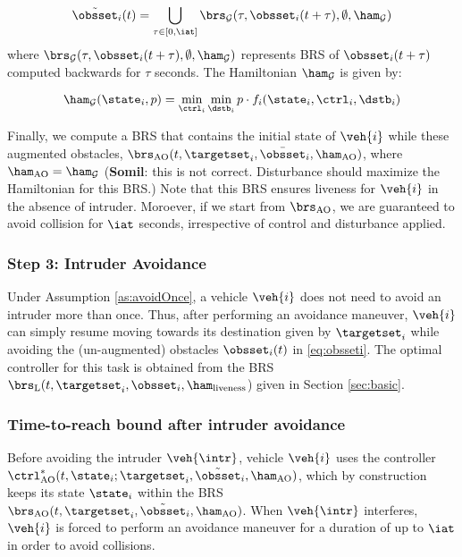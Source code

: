 \begin{equation} \label{eqn:inducedobs}
\tilde\obsset_i(t) = \bigcup_{\tau \in [0, \iat]} \brs_{\mathcal{G}}(\tau, \obsset_i(t+\tau), \emptyset, \ham_{\mathcal{G}})
\end{equation}
where $\brs_{\mathcal{G}}(\tau, \obsset_i(t+\tau), \emptyset, \ham_{\mathcal{G}})$ represents BRS of $\obsset_i(t+\tau)$ computed backwards for $\tau$ seconds. The Hamiltonian 
$\ham_{\mathcal{G}}$ is given by:

\begin{equation} \label{eqn:BRSham}
\ham_{\mathcal{G}}(\state_i, p) = \min_{\ctrl_i} \min_{\dstb_i} p \cdot f_i (\state_i, \ctrl_i, \dstb_i)
\end{equation}

Finally, we compute a BRS that contains the initial state of $\veh{i}$ while these augmented obstacles, $\brs_\text{AO}(t, \targetset_i, \bar\obsset_i, \ham_\text{AO})$, where $\ham_\text{AO} = \ham_{\mathcal{G}}$ (\textbf{Somil}: this is not correct. Disturbance should maximize the Hamiltonian for this BRS.) Note that this BRS ensures liveness for $\veh{i}$ in the absence of intruder. Moroever, if we start from $\brs_\text{AO}$, we are guaranteed to avoid collision for $\iat$ seconds, irrespective of control and disturbance applied. 

\subsubsection{Step 3: Intruder Avoidance \label{sec:intruder_after}}
Under Assumption \ref{as:avoidOnce}, a vehicle $\veh{i}$ does not need to avoid an intruder more than once. Thus, after performing an avoidance maneuver, $\veh{i}$ can simply resume moving towards its destination given by $\targetset_i$ while avoiding the (un-augmented) obstacles $\obsset_i(t)$ in \eqref{eq:obsseti}. The optimal controller for this task is obtained from the BRS $\brs_\text{L}(t, \targetset_i, \obsset_i, \ham_\text{liveness}$) given in Section \ref{sec:basic}.

\subsubsection{Time-to-reach bound after intruder avoidance}
Before avoiding the intruder $\veh{\intr}$, vehicle $\veh{i}$ uses the controller $\ctrl^*_\text{AO}(t, \state_i; \targetset_i, \tilde\obsset_i, \ham_\text{AO})$, which by construction keeps its state $\state_i$ within the BRS $\brs_\text{AO}(t, \targetset_i, \tilde\obsset_i, \ham_\text{AO})$. When $\veh{\intr}$ interferes, $\veh{i}$ is forced to perform an avoidance maneuver for a duration of up to $\iat$ in order to avoid collisions. 

